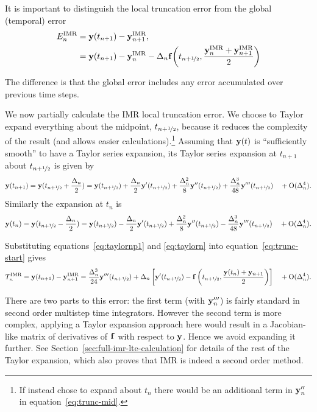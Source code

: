 It is important to distinguish the local truncation error from the global (temporal) error
\begin{equation}
  \label{eq:global-temporal-error}
  \begin{aligned}
    E_n^\imr &= \yv(t_{n+1}) - \yv_{n+1}^\imr, \\
    &=  \yv(t_{n+1}) - \yv_n^\imr - \dtn \fv\bigb{ \thf, \frac{\yv_n^\imr + \yv_{n+1}^\imr}{2} }
  \end{aligned}
\end{equation}


The difference is that the global error includes any error accumulated over previous time steps.

We now partially calculate the IMR local truncation error.
We choose to Taylor expand everything about the midpoint, $t_{n+\nicefrac{1}{2}}$, because it reduces the complexity of the result (and allows easier calculations).\footnote{If instead chose to expand about $t_n$ there would be an additional term in $\mathbf{y}_n''$ in equation~\eqref{eq:trunc-mid}.}
Assuming that $\mathbf{y}(t)$ is ``sufficiently smooth'' to have a Taylor series expansion, its Taylor series expansion at $t_{n+1}$ about $t_{n+\nicefrac{1}{2}}$ is given by
\begin{equation}
  \yv(t_{n+1}) = \yv(\thf + \frac{\dtn}{2}) = \yvhf + \frac{\dtn}{2} \yvhf['] + \frac{\dtn^2}{8} \yvhf[''] + \frac{\dtn^3}{48} \yvhf['''] \porder{\dtn^4}.
  \label{eq:taylornp1}
\end{equation}
Similarly the expansion at $t_n$ is
\begin{equation}
  \yv(t_n) = \yv(\thf - \frac{\dtn}{2}) = \yvhf - \frac{\dtn}{2} \yvhf['] + \frac{\dtn^2}{8} \yvhf[''] - \frac{\dtn^3}{48} \yvhf['''] \porder{\dtn^4}.
  \label{eq:taylorn}
\end{equation}

Substituting equations~\eqref{eq:taylornp1} and \eqref{eq:taylorn} into equation~\eqref{eq:trunc-start} gives
\begin{equation}
  \lte^\imr = \yv(t_{n+1}) - \yv_{n+1}^\imr
  = \frac{\dtn^3}{24} \yvhf[''']  + \dtn  \left[ \yvhf[']
    - \fv\left( \thf, \frac{\yv(t_n) + \yv_{n+1}}{2} \right) \right]  \porder{\dtn^4}.
  \label{eq:trunc-mid}
\end{equation}

There are two parts to this error: the first term (with $\mathbf{y}'''_n$) is fairly standard in second order multistep time integrators.
However the second term is more complex, applying a Taylor expansion approach here would result in a Jacobian-like matrix of derivatives of ${\mathbf{f}}$ with respect to $\mathbf{y}$.
Hence we avoid expanding it further.
See Section~\ref{sec:full-imr-lte-calculation} for details of the rest of the Taylor expansion, which also proves that IMR is indeed a second order method.

